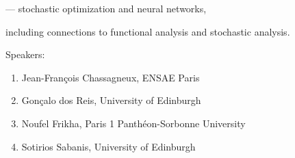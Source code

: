 \begin{talk}
--- stochastic optimization and neural networks,





including connections to functional analysis and stochastic analysis.








\medskip





Speakers:





\begin{enumerate}


\item Jean-Fran\c{c}ois Chassagneux, ENSAE Paris





\item Gon\c{c}alo dos Reis, University of Edinburgh





\item Noufel Frikha, Paris 1 Panth\'eon-Sorbonne University


\item Sotirios Sabanis, University of Edinburgh





 


\end{enumerate}








\end{talk}

